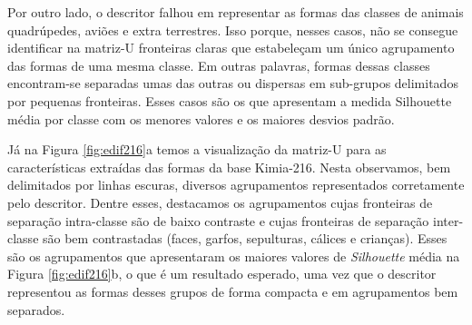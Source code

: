Por outro lado, o descritor falhou em representar as formas das classes de animais quadrúpedes, aviões e extra terrestres. Isso porque, nesses casos, não se consegue identificar na matriz-U fronteiras claras que estabeleçam um único agrupamento das formas de uma mesma classe. Em outras palavras, formas dessas classes encontram-se separadas umas das outras ou dispersas em sub-grupos delimitados por pequenas fronteiras. Esses casos são os que apresentam a medida Silhouette média por classe com os menores valores e os maiores desvios padrão. 

Já na Figura \ref{fig:edif216}a temos a visualização da matriz-U para as características extraídas das formas da base Kimia-216. Nesta observamos, bem delimitados por linhas escuras, diversos agrupamentos  representados corretamente pelo descritor. Dentre esses, destacamos os agrupamentos cujas fronteiras de separação intra-classe são de baixo contraste e cujas fronteiras de separação inter-classe são bem contrastadas (faces, garfos, sepulturas, cálices e crianças). Esses são os  agrupamentos que apresentaram os maiores valores de \emph{Silhouette} média na Figura \ref{fig:edif216}b, o que é um resultado esperado, uma vez que o descritor representou as formas desses grupos de forma compacta e em agrupamentos bem separados.

